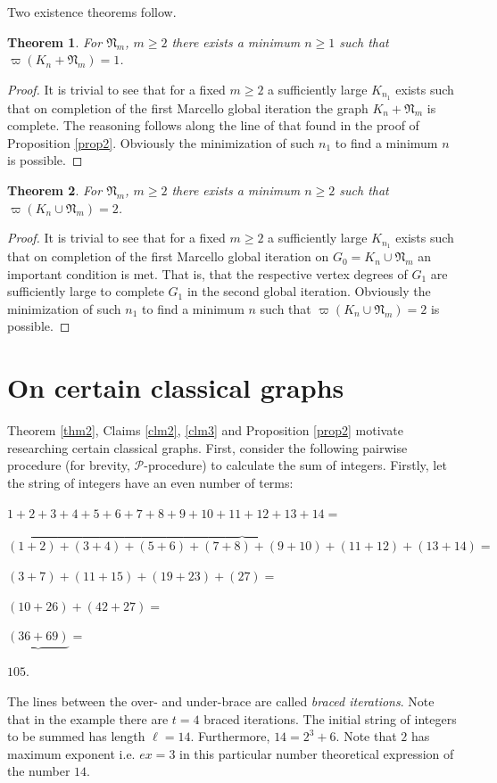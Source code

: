 \documentclass[12pt]{amsart}
\numberwithin{equation}{section}
\newtheorem{theorem}{Theorem}[section]
\numberwithin{equation}{section}
\begin{document}
Two existence theorems follow.
\begin{theorem}\label{thm3}
For $\mathfrak{N}_m$, $m \geq 2$ there exists a minimum $n \geq 1$ such that $\varpi(K_n + \mathfrak{N}_m) = 1$. 
\end{theorem} 
\begin{proof}
It is trivial to see that for a fixed $m \geq 2$ a sufficiently large $K_{n_1}$ exists such that on completion of the first Marcello global iteration the graph $K_n + \mathfrak{N}_m$ is complete. The reasoning follows along the line of that found in the proof of Proposition \ref{prop2}. Obviously the minimization of such $n_1$ to find a minimum $n$ is possible.
\end{proof}
\begin{theorem}\label{thm4}
For $\mathfrak{N}_m$, $m \geq 2$ there exists a minimum $n \geq 2$ such that $\varpi(K_n \cup \mathfrak{N}_m) = 2$. 
\end{theorem} 
\begin{proof}
It is trivial to see that for a fixed $m \geq 2$ a sufficiently large $K_{n_1}$ exists such that on completion of the first Marcello global iteration on $G_0 = K_n \cup \mathfrak{N}_m$ an important condition is met. That is, that the respective vertex degrees of $G_1$ are sufficiently large to complete $G_1$ in the second global iteration. Obviously the minimization of such $n_1$ to find a minimum $n$ such that $\varpi(K_n \cup \mathfrak{N}_m) = 2$ is possible. 
\end{proof}
\section{On certain classical graphs}
Theorem \ref{thm2}, Claims \ref{clm2}, \ref{clm3} and Proposition \ref{prop2} motivate researching certain classical graphs. First, consider the following pairwise procedure (for brevity, $\mathcal{P}$-procedure) to calculate the sum of integers. Firstly, let the string of integers have an even number of terms:
\begin{center}
$1+2+3+4+5+6+7+8+9+10+11+12+13+14 =$

$\overbrace{(1+2)+(3+4)+(5+6)+(7+8)+(9+10)+(11+12)+(13+14)} =$

$(3+7)+(11+15)+(19+23)+(27) =$

$(10+26)+(42+27) =$

$\underbrace{(36+69)} =$

$105$.
\end{center}
The lines between the over- and under-brace are called \emph{braced iterations}. Note that in the example there are $t = 4$ braced iterations. The initial string of integers to be summed has length $\ell = 14$. Furthermore, $14 = 2^3 +6$. Note that $2$ has maximum exponent i.e. $ex = 3$ in this particular number theoretical expression of the number $14$. 
\end{document}
